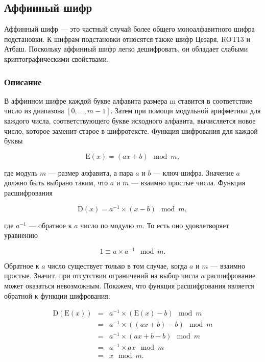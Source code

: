 \subsection{Аффинный шифр}

Аффинный шифр — это частный случай более общего моноалфавитного шифра 
подстановки. К шифрам подстановки относятся также шифр Цезаря, 
ROT13 и Атбаш. Поскольку аффинный шифр легко дешифровать, 
он обладает слабыми криптографическими свойствами.

\subsubsection{Описание}

В аффинном шифре каждой букве алфавита размера m ставится в 
соответствие число из диапазона $[0, ..., m - 1]$. 
Затем при помощи модульной арифметики для каждого числа, соответствующего 
букве исходного алфавита, вычисляется новое число, которое заменит 
старое в шифротексте. Функция шифрования для каждой буквы

    $$\mbox{E}(x) = (ax + b) \mod{m},$$

где модуль $m$ — размер алфавита, а пара $a$ и $b$ — ключ шифра. Значение 
$a$ должно быть выбрано таким, что $a$ и $m$ — взаимно простые числа. Функция 
расшифрования

    $$\mbox{D}(x) = a^{-1} \times (x - b) \mod{m},$$

где $a^{-1}$ — обратное к $a$ число по модулю $m$. То есть оно удовлетворяет 
уравнению

    $$1 \equiv a \times a^{-1} \mod{m}.$$

Обратное к $a$ число существует только в том случае, когда $a$ и $m$ — взаимно 
простые. Значит, при отсутствии ограничений на выбор числа $a$ расшифрование 
может оказаться невозможным. Покажем, что функция расшифрования является 
обратной к функции шифрования:

\begin{equation}
    \begin{matrix}
        \mbox{D}(\mbox{E}(x)) 
          &= &a^{-1} \times (\mbox{E}(x) - b) \mod{m} \\ 
          &= &a^{-1} \times ((ax + b) - b) \mod{m} \\ 
          &= &a^{-1} \times (ax + b - b) \mod{m} \\ 
          &= &a^{-1} \times ax \mod{m}\\ 
          &= &x \mod{m}. 
    \end{matrix}
\end{equation}


